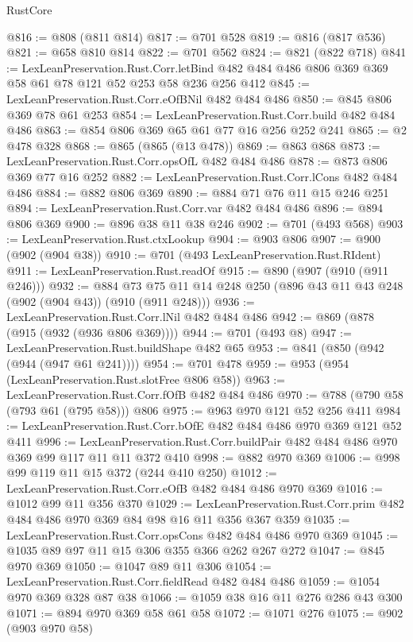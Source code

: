 \begin{lexlean}{RustCore}
\begin{coremodule}
@816 := @808 (@811 @814)
@817 := @701 @528
@819 := @816 (@817 @536)
@821 := @658 @810 @814
@822 := @701 @562
@824 := @821 (@822 @718)
@841 := LexLeanPreservation.Rust.Corr.letBind
    @482
    @484
    @486
    @806
    @369
    @369
    @58
    @61
    @78
    @121
    @52
    @253
    @58
    @236
    @256
    @412
@845 := LexLeanPreservation.Rust.Corr.eOfBNil @482 @484 @486
@850 := @845 @806 @369 @78 @61 @253
@854 := LexLeanPreservation.Rust.Corr.build @482 @484 @486
@863 := @854 @806 @369 @65 @61 @77 @16 @256 @252 @241
@865 := @2 @478 @328
@868 := @865 (@865 (@13 @478))
@869 := @863 @868
@873 := LexLeanPreservation.Rust.Corr.opsOfL @482 @484 @486
@878 := @873 @806 @369 @77 @16 @252
@882 := LexLeanPreservation.Rust.Corr.lCons @482 @484 @486
@884 := @882 @806 @369
@890 := @884 @71 @76 @11 @15 @246 @251
@894 := LexLeanPreservation.Rust.Corr.var @482 @484 @486
@896 := @894 @806 @369
@900 := @896 @38 @11 @38 @246
@902 := @701 (@493 @568)
@903 := LexLeanPreservation.Rust.ctxLookup
@904 := @903 @806
@907 := @900 (@902 (@904 @38))
@910 := @701 (@493 LexLeanPreservation.Rust.RIdent)
@911 := LexLeanPreservation.Rust.readOf
@915 := @890 (@907 (@910 (@911 @246)))
@932 := @884 @73 @75 @11 @14 @248 @250 (@896 @43 @11 @43 @248 (@902 (@904 @43)) (@910 (@911 @248)))
@936 := LexLeanPreservation.Rust.Corr.lNil @482 @484 @486
@942 := @869 (@878 (@915 (@932 (@936 @806 @369))))
@944 := @701 (@493 @8)
@947 := LexLeanPreservation.Rust.buildShape @482 @65
@953 := @841 (@850 (@942 (@944 (@947 @61 @241))))
@954 := @701 @478
@959 := @953 (@954 (LexLeanPreservation.Rust.slotFree @806 @58))
@963 := LexLeanPreservation.Rust.Corr.fOfB @482 @484 @486
@970 := @788 (@790 @58 (@793 @61 (@795 @58))) @806
@975 := @963 @970 @121 @52 @256 @411
@984 := LexLeanPreservation.Rust.Corr.bOfE @482 @484 @486 @970 @369 @121 @52 @411
@996 := LexLeanPreservation.Rust.Corr.buildPair @482 @484 @486 @970 @369 @99 @117 @11 @11 @372 @410
@998 := @882 @970 @369
@1006 := @998 @99 @119 @11 @15 @372 (@244 @410 @250)
@1012 := LexLeanPreservation.Rust.Corr.eOfB @482 @484 @486 @970 @369
@1016 := @1012 @99 @11 @356 @370
@1029 := LexLeanPreservation.Rust.Corr.prim @482 @484 @486 @970 @369 @84 @98 @16 @11 @356 @367 @359
@1035 := LexLeanPreservation.Rust.Corr.opsCons @482 @484 @486 @970 @369
@1045 := @1035 @89 @97 @11 @15 @306 @355 @366 @262 @267 @272
@1047 := @845 @970 @369
@1050 := @1047 @89 @11 @306
@1054 := LexLeanPreservation.Rust.Corr.fieldRead @482 @484 @486
@1059 := @1054 @970 @369 @328 @87 @38
@1066 := @1059 @38 @16 @11 @276 @286 @43 @300
@1071 := @894 @970 @369 @58 @61 @58
@1072 := @1071 @276
@1075 := @902 (@903 @970 @58)

\end{coremodule}
\end{lexlean}
